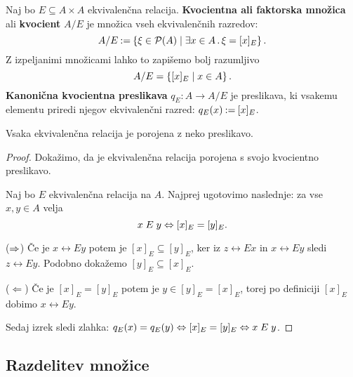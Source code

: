 \begin{definicija}
  Naj bo $E \subseteq A \times A$ ekvivalenčna relacija. \textbf{Kvocientna ali faktorska množica} ali \textbf{kvocient} $A/E$ je množica vseh ekvivalenčnih razredov:
  \begin{equation*}
    A/E \mathbin{{:}{=}} \left\{ \xi \in \mathcal{P}(A) \; \middle| \; \exists x \in A \,.\, \xi = [x]_E \right\}.
  \end{equation*}
  Z izpeljanimi množicami lahko to zapišemo bolj razumljivo
  \begin{equation*}
    A/E = \left\{ [x]_E \; \middle| \; x \in A \right\}.
  \end{equation*}
  \textbf{Kanonična kvocientna preslikava} $q_E : A \to A/E$ je preslikava, ki vsakemu elementu
  priredi njegov ekvivalenčni razred: $q_E(x) \mathbin{{:}{=}} [x]_E$.
\end{definicija}

\begin{izrek}
  Vsaka ekvivalenčna relacija je porojena z neko preslikavo.
\end{izrek}

\begin{proof}
  Dokažimo, da je ekvivalenčna relacija porojena s svojo kvocientno preslikavo.

  Naj bo $E$ ekvivalenčna relacija na $A$. Najprej ugotovimo naslednje: za vse $x,
  y \in A$ velja
  \begin{equation*}
    x \mathrel{E} y \Leftrightarrow [x]_E = [y]_E.
  \end{equation*}

  ($\Rightarrow$) Če je $x \rel{E} y$ potem je $[x]_E \subseteq [y]_E$, ker iz $z \rel{E} x$ in $x \rel{E} y$ sledi $z \rel{E} y$.
  Podobno dokažemo $[y]_E \subseteq [x]_E$.

  ($\Leftarrow$) Če je $[x]_E = [y]_E$ potem je $y \in [y]_E = [x]_E$, torej po definiciji $[x]_E$
  dobimo $x \rel{E} y$.

  Sedaj izrek sledi zlahka: $q_E(x) = q_E(y) \Leftrightarrow [x]_E = [y]_E \Leftrightarrow x \mathrel{E} y$.
\end{proof}


\subsection{Razdelitev množice}

